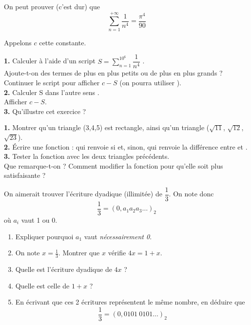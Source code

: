 \documentclass[a4paper,12pt,french]{book}
\begin{document}
\begin{exercice}
On peut prouver (c'est dur) que $$\sum_{n=1}^{+\infty}\dfrac{1}{n^4}=\dfrac{\pi^4}{90}$$

Appelons $c$ cette constante.

\textbf{1.} Calculer à l'aide d'un script $\displaystyle S=\sum_{n=1}^{10^6}\dfrac{1}{n^4}$ .\\

Ajoute-t-on des termes de plus en plus petits ou de plus en plus grands ?\\
Continuer le script pour afficher $c-S$ (on pourra utiliser ).\\

\textbf{2.} Calculer S \og dans l'autre sens \fg.\\
Afficher $c-S$.\\

\textbf{3.} Qu'illustre cet exercice ?
\end{exercice}


\begin{exercice}

\textbf{1.}	Montrer qu'un triangle (3,4,5) est rectangle, ainsi qu'un triangle ($\sqrt{11}$, $\sqrt{12}$, $\sqrt{23}$).\\

\textbf{2.} \'Ecrire une fonction : qui renvoie  si  et, sinon, qui renvoie la différence
entre  et .\\

\textbf{3.} Tester la fonction  avec les deux triangles précédents.\\
			Que remarque-t-on ? Comment modifier la fonction pour qu'elle soit plus satisfaisante ?
\end{exercice}

\begin{exercice}[**]
	On aimerait trouver l'écriture dyadique (illimitée) de $\dfrac{1}{3}$.
	On note donc $$\dfrac{1}{3}=(0,a_1a_2a_3\ldots)_2$$
	où $a_i$ vaut 1 ou 0.
	\begin{enumerate}[\bfseries 1.]
		\item 	Expliquer pourquoi $a_1$ vaut \textit{nécessairement 0}.
		\item 	On note $x=\frac{1}{3}$. Montrer que $x$ vérifie $4x=1+x$.
		 \item 	Quelle est l'écriture dyadique de $4x$ ?
		 \item 	Quelle est celle de $1+x$ ?
		 \item 	En écrivant que ces 2 écritures représentent le même nombre, en déduire que $$\dfrac{1}{3}=(0,0101\ 0101\ldots )_2$$
	\end{enumerate}
\end{exercice}
\end{document}
